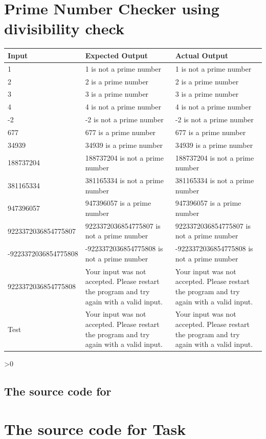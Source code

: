 \documentclass[12pt,a4paper,onesided]{report}
\newcommand{\source}{\pagebreak
	\ifnum\value{section}>0
		\subsection{The source code for \thesection}

	\else
		\section{The source code for Task \thechapter}

	\fi
	}
\begin{document}
\section{Prime Number Checker using divisibility check}
\begin{table}[h!]
	\centering
\begin{tabular}{lp{30ex}p{30ex}}
	\toprule Input & Expected Output & Actual Output\\
	\midrule
	1 & 1 is not a prime number& 1 is not a prime number\\
	2 & 2 is a prime number & 2 is a prime number\\
	3 & 3 is a prime number & 3 is a prime number\\
	4 & 4 is not a prime number & 4 is not a prime number\\
	-2 & -2 is not a prime number & -2 is not a prime number\\
	677 & 677 is a prime number & 677 is a prime number\\
	34939 & 34939 is a prime number & 34939 is a prime number\\
	188737204 & 188737204 is not a prime number & 188737204 is not a prime number\\
	381165334 & 381165334 is not a prime number & 381165334 is not a prime number\\
	947396057 & 947396057 is a prime number & 947396057 is a prime number\\
	9223372036854775807 & 9223372036854775807 is not a prime number & 9223372036854775807 is not a prime number\\
	-9223372036854775808 & -9223372036854775808 is not a prime number &-9223372036854775808 is not a prime number\\
	9223372036854775808 & Your input was not accepted. Please restart the program and try again with a valid input. & Your input was not accepted. Please restart the program and try again with a valid input.\\
	Test & Your input was not accepted. Please restart the program and try again with a valid input. & Your input was not accepted. Please restart the program and try again with a valid input.\\
	
	\bottomrule
	\end{tabular}
\end{table}
\source

\newpage
\end{document}
